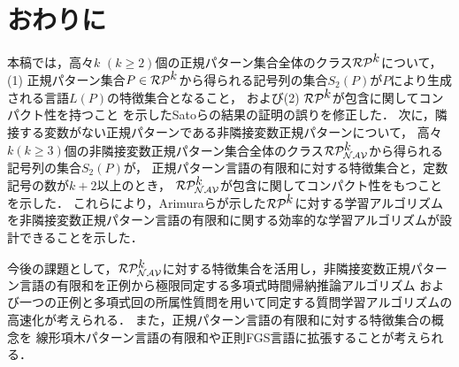 \section{おわりに}
本稿では，高々$k$ $(k\ge 2)$個の正規パターン集合全体のクラス$\mathcal{RP^{\mbox{$k$}}}$について，(1) 正規パターン集合$P\in\mathcal{RP^{\mbox{$k$}}}$から得られる記号列の集合$S_2(P)$が$P$により生成される言語$L(P)$の特徴集合となること，
および(2) $\mathcal{RP^{\mbox{$k$}}}$が包含に関してコンパクト性を持つこと
を示したSatoら\cite{Sato1}の結果の証明の誤りを修正した．
次に，隣接する変数がない正規パターンである非隣接変数正規パターンについて，
高々$k(k\ge 3)$個の非隣接変数正規パターン集合全体のクラス$\mathcal{RP^{\mbox{$k$}}_{NAV}}$から得られる記号列の集合$S_2(P)$が，
正規パターン言語の有限和に対する特徴集合と，定数記号の数が$k+2$以上のとき，
$\mathcal{RP^{\mbox{$k$}}_{NAV}}$が包含に関してコンパクト性をもつことを示した．
これらにより，Arimuraら\cite{Arimura1994}が示した$\mathcal{RP^{\mbox{$k$}}}$に対する学習アルゴリズムを非隣接変数正規パターン言語の有限和に関する効率的な学習アルゴリズムが設計できることを示した．

今後の課題として，$\mathcal{RP^{\mbox{$k$}}_{NAV}}$に対する特徴集合を活用し，非隣接変数正規パターン言語の有限和を正例から極限同定する多項式時間帰納推論アルゴリズム
および一つの正例と多項式回の所属性質問を用いて同定する質問学習アルゴリズムの高速化が考えられる．
また，正規パターン言語の有限和に対する特徴集合の概念を
線形項木パターン言語\cite{Suzuki2006}の有限和や正則FGS言語\cite{Uchida1994}に拡張することが考えられる．


